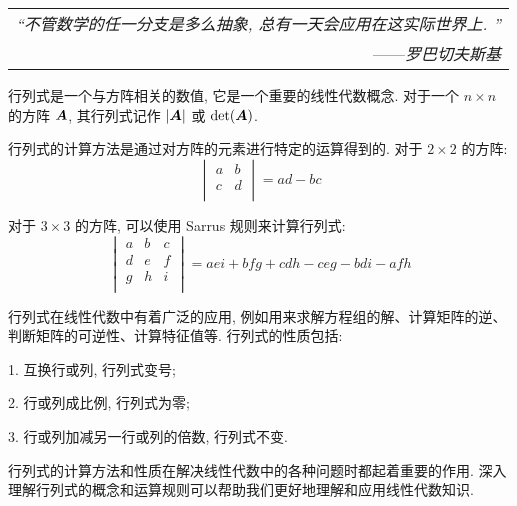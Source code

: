 \begin{flushright}
    \begin{tabular}{r||}
        \textit{“不管数学的任一分支是多么抽象, 总有一天会应用在这实际世界上. ”}\\
        ——\textit{罗巴切夫斯基}
    \end{tabular}
\end{flushright}

行列式是一个与方阵相关的数值, 它是一个重要的线性代数概念. 对于一个 $n \times n$ 的方阵 $\vb*{A}$, 其行列式记作 $|\vb*{A}|$ 或 $\det(\vb*{A})$. 

行列式的计算方法是通过对方阵的元素进行特定的运算得到的. 对于 $2 \times 2$ 的方阵: 
$$
\begin{vmatrix}
a & b \\
c & d \\
\end{vmatrix} = ad - bc
$$

对于 $3 \times 3$ 的方阵, 可以使用 Sarrus 规则来计算行列式: 
$$
\begin{vmatrix}
a & b & c \\
d & e & f \\
g & h & i \\
\end{vmatrix} = aei + bfg + cdh - ceg - bdi - afh
$$

行列式在线性代数中有着广泛的应用, 例如用来求解方程组的解、计算矩阵的逆、判断矩阵的可逆性、计算特征值等. 行列式的性质包括: 

1. 互换行或列, 行列式变号;

2. 行或列成比例, 行列式为零;

3. 行或列加减另一行或列的倍数, 行列式不变. 

行列式的计算方法和性质在解决线性代数中的各种问题时都起着重要的作用. 深入理解行列式的概念和运算规则可以帮助我们更好地理解和应用线性代数知识. 
